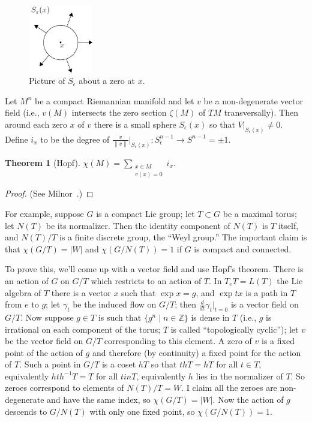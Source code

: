 \documentclass{article}
\newcommand{\Z}{\mathbb{Z}}
\newtheorem{thm}{Theorem}[section]
\begin{document}
\begin{figure}
\centering\includegraphics[width=0.25\textwidth]{figures/figure39.pdf}
\caption{\small Picture of $S_\epsilon$ about a zero at $x$.}
\end{figure}
Let $M^n$ be a compact Riemannian manifold and let $v$ be a non-degenerate vector field (i.e., $v(M)$ intersects the zero section $\zeta(M)$ of $TM$ transversally).  Then around each zero $x$ of $v$ there is a small sphere $S_\epsilon(x)$ so that $V|_{S_\epsilon(x)} \ne 0$.  Define $i_x$ to be the degree of $\frac{v}{\|v\|}|_{S_\epsilon(x)}: S^{n-1}_\epsilon \to S^{n-1} = \pm 1$.
\begin{thm}[Hopf]
$\chi(M) = \sum_{\substack{x \in M \\ v(x) = 0}} i_x$.
\end{thm}
\begin{proof}
(See Milnor~\cite{Milnor}.)
\end{proof}
For example, suppose $G$ is a compact Lie group; let $T \subset G$ be a maximal torus; let $N(T)$ be its normalizer.  Then the identity component of $N(T)$ is $T$ itself, and $N(T) / T$ is a finite discrete group, the ``Weyl group.''  The important claim is that $\chi(G / T) = |W|$ and $\chi(G / N(T)) = 1$ if $G$ is compact and connected.

To prove this, we'll come up with a vector field and use Hopf's theorem.  There is an action of $G$ on $G/T$ which restricts to an action of $T$.  In $T_eT = L(T)$ the Lie algebra of $T$ there is a vector $x$ such that $\exp x = g$, and $\exp tx$ is a path in $T$ from $e$ to $g$; let $\gamma_t$ be the induced flow on $G/T$; then $\frac{d}{dt} \gamma_t |_{t = 0}$ is a vector field on $G/T$.  Now suppose $g \in T$ is such that $\{g^n \mid n \in \Z\}$ is dense in $T$ (i.e., $g$ is irrational on each component of the torus; $T$ is called ``topologically cyclic''); let $v$ be the vector field on $G/T$ corresponding to this element.  A zero of $v$ is a fixed point of the action of $g$ and therefore (by continuity) a fixed point for the action of $T$.  Such a point in $G/T$ is a coset $hT$ so that $thT = hT$ for all $t \in T$, equivalently $hth^{-1} T = T$ for all $t in T$, equivalently $h$ lies in the normalizer of $T$.  So zeroes correspond to elements of $N(T) / T = W$.  I claim all the zeroes are non-degenerate and have the same index, so $\chi(G/T) = |W|$.  Now the action of $g$ descends to $G/N(T)$ with only one fixed point, so $\chi(G/N(T)) = 1$.
\end{document}
